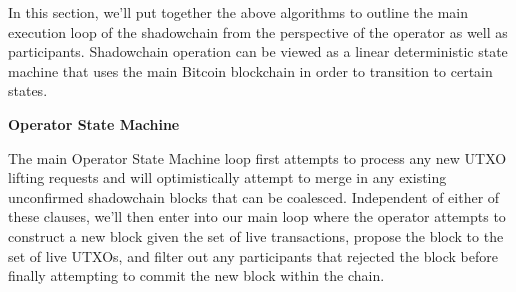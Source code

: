 \documentclass[10pt,a4paper]{article}
\theoremstyle{definition}
\begin{document}
In this section, we'll put together the above algorithms to outline the main
execution loop of the shadowchain from the perspective of the operator as well
as participants. Shadowchain operation can be viewed as a linear deterministic
state machine that uses the main Bitcoin blockchain in order to transition to
certain states.


\begin{center}
    \textbf{Operator State Machine}
\end{center}

The main Operator State Machine loop first attempts to process any new UTXO
lifting requests and will optimistically attempt to merge in any existing
unconfirmed shadowchain blocks that can be coalesced. Independent of either of
these clauses, we'll then enter into our main loop where the operator attempts
to construct a new block given the set of live transactions, propose the block
to the set of live UTXOs, and filter out any participants that rejected the
block before finally attempting to commit the new block within the chain.

\end{document}
